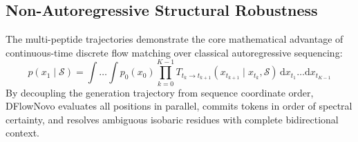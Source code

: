\subsection{Non-Autoregressive Structural Robustness}

The multi-peptide trajectories demonstrate the core mathematical advantage of continuous-time discrete flow matching over classical autoregressive sequencing:
\begin{equation}
p(x_1 \mid \mathcal{S}) = \int \dots \int p_0(x_0) \prod_{k=0}^{K-1} T_{t_k \to t_{k+1}}(x_{t_{k+1}} \mid x_{t_k}, \mathcal{S}) \, \mathrm{d}x_{t_1} \dots \mathrm{d}x_{t_{K-1}}
\end{equation}
By decoupling the generation trajectory from sequence coordinate order, DFlowNovo evaluates all positions in parallel, commits tokens in order of spectral certainty, and resolves ambiguous isobaric residues with complete bidirectional context.



